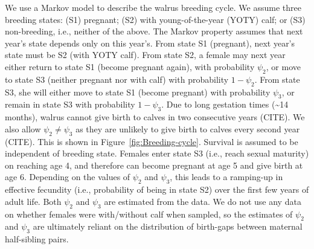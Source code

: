 We use a Markov model to describe the walrus breeding cycle. We assume
three breeding states: (S1) pregnant; (S2) with young-of-the-year
(YOTY) calf; or (S3) non-breeding, i.e., neither of the above. The
Markov property assumes that next year's state depends only on this
year's. From state S1 (pregnant), next year's state must be S2 (with
YOTY calf). From state S2, a female may next year either return to
state S1 (become pregnant again), with probability $\psi_{2}$, or
move to state S3 (neither pregnant nor with calf) with probability
$1-\psi_{2}$. From state S3, she will either move to state S1 (become
pregnant) with probability $\psi_{3}$, or remain in state S3 with
probability $1-\psi_{3}$. Due to long gestation times (\textasciitilde 14
months), walrus cannot give birth to calves in two consecutive years
(CITE). We also allow $\psi_{2}\neq\psi_{3}$ as they are unlikely
to give birth to calves every second year (CITE). This is shown in
Figure~\ref{fig:Breeding-cycle}. Survival is assumed to be independent
of breeding state. Females enter state S3 (i.e., reach sexual maturity)
on reaching age 4, and therefore can become pregnant at age 5 and
give birth at age 6. Depending on the values of $\psi_{2}$ and $\psi_{3}$,
this leads to a ramping-up in effective fecundity (i.e., probability
of being in state S2) over the first few years of adult life. Both
$\psi_{2}$ and $\psi_{3}$ are estimated from the data. We do not
use any data on whether females were with/without calf when sampled,
so the estimates of $\psi_{2}$ and $\psi_{3}$ are ultimately reliant
on the distribution of birth-gaps between maternal half-sibling pairs.

